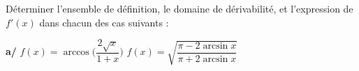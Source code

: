 
\begin{exercice}\label{exostarterST-0014}

  
Déterminer l'ensemble de définition, le domaine de dérivabilité, et l'expression de $f'(x)$ dans chacun des cas suivants :

{\bfseries a/} $f(x) = \arccos\Big( \dfrac{2\sqrt{x}}{1+x}\Big)$  $f(x)=\sqrt{\dfrac{\pi-2\arcsin x}{\pi + 2 \arcsin x}}$



\end{exercice}
